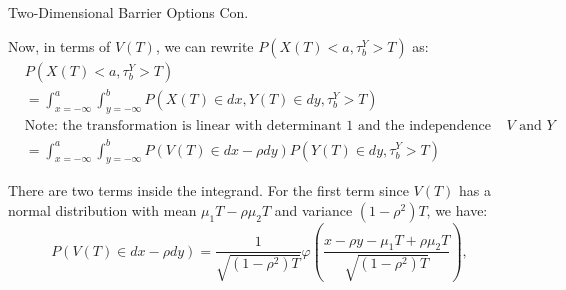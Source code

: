 \documentclass{beamer}
\begin{document}
\begin{frame}{Two-Dimensional Barrier Options Con.}

    {\footnotesize \footnotesize
    \par Now, in terms of \(V(T)\), we can rewrite \(P(X(T) < a,  \tau_b^Y > T)\) as:
        \begin{align*}
        &P(X(T) < a,  \tau_b^Y > T) \\
        &= \int_{x=-\infty}^{a} \int_{y=-\infty}^{b} P(X(T) \in dx,  Y(T) \in dy,  \tau_b^Y > T) \\
        &\text{Note: the transformation is linear with determinant 1 and the independence of \(V\) and \(Y\)}\\
        &= \int_{x=-\infty}^{a} \int_{y=-\infty}^{b} P(V(T) \in dx - \rho dy) P(Y(T) \in dy,  \tau_b^Y > T)
        \end{align*}\pause
    \par There are two terms inside the integrand. For the first term since \( V(T) \) has a normal distribution with mean \( \mu_1 T - \rho \mu_2 T \) 
    and variance \( (1 - \rho^2)T \), we have:
        \[
        P(V(T) \in dx - \rho dy) = \frac{1}{\sqrt{(1 - \rho^2)T}} \varphi \left( \frac{x - \rho y - \mu_1 T + \rho \mu_2 T}{\sqrt{(1 - \rho^2)T}} \right),
        \]
    }
\end{frame}
    
\end{document}
